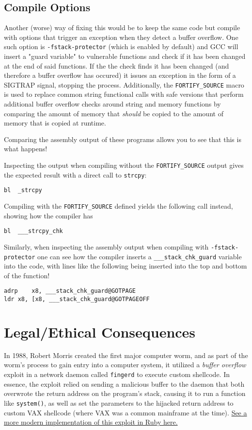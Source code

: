 \documentclass[11pt]{article}
\begin{document}
\subsection*{Compile Options}
\label{sec:orgc0658df}
Another (worse) way of fixing this would be to keep the same code but compile with options that trigger an exception when they detect a buffer overflow. One such option is \texttt{-fstack-protector} (which is enabled by default) and GCC will insert a "guard variable" to vulnerable functions and check if it has been changed at the end of said functions. If the the check finds it has been changed (and therefore a buffer overflow has occured) it issues an exception in the form of a SIGTRAP signal, stopping the process. Additionally, the \texttt{FORTIFY\_SOURCE} macro is used to replace common string functional calls with safe versions that perform additional buffer overflow checks around string and memory functions by comparing the amount of memory that \emph{should} be copied to the amount of memory that is copied at runtime.

Comparing the assembly output of these programs allows you to see that this is what happens!

Inspecting the output when compiling without the \texttt{FORTIFY\_SOURCE} output gives the expected result with a direct call to \texttt{strcpy}:
\begin{verbatim}
bl	_strcpy
\end{verbatim}
Compiling with the \texttt{FORTIFY\_SOURCE} defined yields the following call instead, showing how the compiler has 
\begin{verbatim}
bl	___strcpy_chk
\end{verbatim}

Similarly, when inspecting the assembly output when compiling with \texttt{-fstack-protector} one can see how the compiler inserts a \texttt{\_\_\_stack\_chk\_guard} variable into the code, with lines like the following being inserted into the top and bottom of the function!
\begin{verbatim}
adrp	x8, ___stack_chk_guard@GOTPAGE
ldr	x8, [x8, ___stack_chk_guard@GOTPAGEOFF
\end{verbatim}

\section*{Legal/Ethical Consequences}
\label{sec:org180a675}

In 1988, Robert Morris created the first major computer worm, and as part of the worm's process to gain entry into a computer system, it utilized a \emph{buffer overflow} exploit in a network daemon called \texttt{fingerd} to execute custom shellcode. In essence, the exploit relied on sending a malicious buffer to the daemon that both overwrote the return address on the program's stack, causing it to run a function like \texttt{system()}, as well as set the parameters to the hijacked return address to custom VAX shellcode (where VAX was a common mainframe at the time). \href{https://github.com/rapid7/metasploit-framework/blob/master/modules/exploits/bsd/finger/morris\_fingerd\_bof.rb}{See a more modern implementation of this exploit in Ruby here.}
\end{document}
